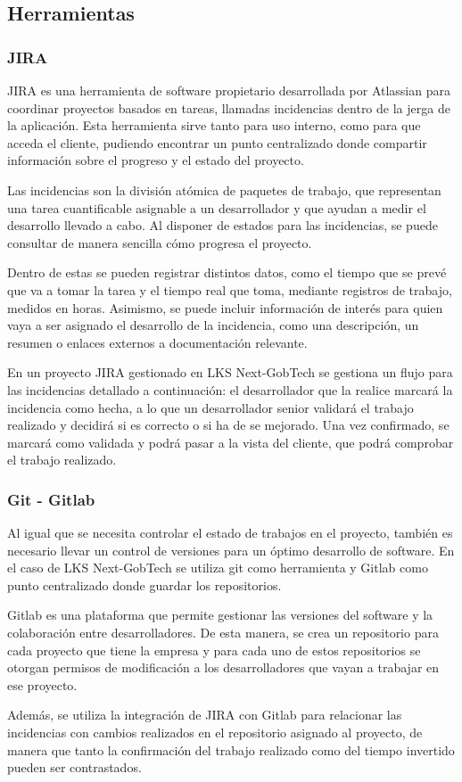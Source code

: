 \subsection{Herramientas}
\subsubsection{JIRA}
JIRA es una herramienta de software propietario desarrollada por Atlassian para coordinar proyectos basados en tareas, llamadas incidencias dentro de la jerga de la aplicación. Esta herramienta sirve tanto para uso interno, como para que acceda el cliente, pudiendo encontrar un punto centralizado donde compartir información sobre el progreso y el estado del proyecto.

Las incidencias son la división atómica de paquetes de trabajo, que representan una tarea cuantificable asignable a un desarrollador y que ayudan a medir el desarrollo llevado a cabo. Al disponer de estados para las incidencias, se puede consultar de manera sencilla cómo progresa el proyecto. 

Dentro de estas se pueden registrar distintos datos, como el tiempo que se prevé que va a tomar la tarea y el tiempo real que toma, mediante registros de trabajo, medidos en horas. Asimismo, se puede incluir información de interés para quien vaya a ser asignado el desarrollo de la incidencia, como una descripción, un resumen o enlaces externos a documentación relevante.

En un proyecto JIRA gestionado en LKS Next-GobTech se gestiona un flujo para las incidencias detallado a continuación: el desarrollador que la realice marcará la incidencia como hecha, a lo que un desarrollador senior validará el trabajo realizado y decidirá si es correcto o si ha de se mejorado. Una vez confirmado, se marcará como validada y podrá pasar a la vista del cliente, que podrá comprobar el trabajo realizado.

\subsubsection{Git - Gitlab}
Al igual que se necesita controlar el estado de trabajos en el proyecto, también es necesario llevar un control de versiones para un óptimo desarrollo de software. En el caso de LKS Next-GobTech se utiliza git \cite{chacon2014progit} como herramienta y Gitlab como punto centralizado donde guardar los repositorios. 

Gitlab es una plataforma que permite gestionar las versiones del software y la colaboración entre desarrolladores. De esta manera, se crea un repositorio para cada proyecto que tiene la empresa y para cada uno de estos repositorios se otorgan permisos de modificación a los desarrolladores que vayan a trabajar en ese proyecto.

Además, se utiliza la integración de JIRA con Gitlab para relacionar las incidencias con cambios realizados en el repositorio asignado al proyecto, de manera que tanto la confirmación del trabajo realizado como del tiempo invertido pueden ser contrastados.